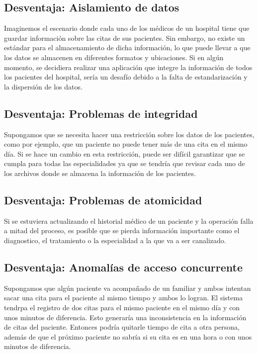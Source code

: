 \vsapace{0.3cm}

\subsection*{\textcolor{unamblue}{Desventaja: Aislamiento de datos}}
Imaginemos el escenario donde cada uno de los médicos de un hospital tiene que guardar información sobre las citas de sus pacientes. Sin embargo, no existe un estándar para el almacenamiento de dicha información, lo que puede llevar a que los datos se almacenen en diferentes formatos y ubicaciones.
Si en algún momento, se decidiera realizar una aplicación que integre la información de todos los pacientes del hospital, sería un desafío debido a la falta de estandarización y la dispersión de los datos. 

\vsapace{0.3cm}

\subsection*{\textcolor{unamblue}{Desventaja: Problemas de integridad}}
Supongamos que se necesita hacer una restricción sobre los datos de los pacientes, como por ejemplo, que un paciente no puede tener más de una cita en el mismo día. Si se hace un cambio en esta restricción, puede ser difícil garantizar que se cumpla para todas las especialidades ya que se tendría
que revisar cada uno de los archivos donde se almacena la información de los pacientes.

\vsapace{0.3cm}

\subsection*{\textcolor{unamblue}{Desventaja: Problemas de atomicidad}}
Si se estuviera actualizando el historial médico de un paciente y la operación falla a mitad del proceso, es posible que se pierda información importante como el diagnostico, el tratamiento o la especialidad a la que va a ser canalizado.

\vsapace{0.3cm}

\subsection*{\textcolor{unamblue}{Desventaja: Anomalías de acceso concurrente}}
Supongamos que algún paciente va acompañado de un familiar y ambos intentan sacar una cita para el paciente al mismo tiempo y ambos lo logran. El sistema tendrpa el registro de dos citas para el mismo paciente en el mismo día y con unos minutos de diferencia. 
Esto generaría una inconsistencia en la información de citas del paciente. Entonces podría quitarle tiempo de cita a otra persona, además de que el próximo paciente no sabría si su cita es en una hora o con unos minutos de diferencia.


